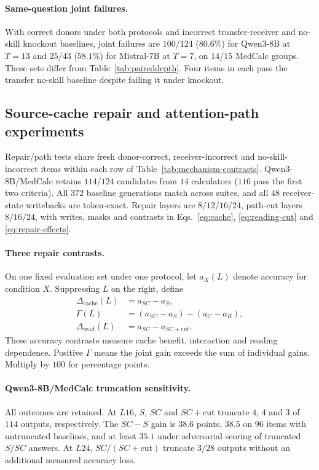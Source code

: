 \paragraph{Same-question joint failures.}
\label{app:joint-failure}
With correct donors under both protocols and incorrect transfer-receiver
and no-skill knockout baselines, joint failures are $100/124$ ($80.6\%$)
for Qwen3-8B at $T=13$ and $25/43$ ($58.1\%$) for Mistral-7B at $T=7$,
on $14/15$ MedCalc groups. These sets differ from Table~\ref{tab:paireddepth}.
Four items in each pass the transfer no-skill baseline despite failing
it under knockout.

\subsection{Source-cache repair and attention-path experiments}
\label{app:mechanism}

Repair/path tests share fresh donor-correct, receiver-incorrect and
no-skill-incorrect items within each row of Table~\ref{tab:mechanism-contrasts}.
Qwen3-8B/MedCalc retains $114/124$ candidates from $14$ calculators
($116$ pass the first two criteria). All $372$ baseline generations match
across suites, and all $48$ receiver-state writebacks are token-exact.
Repair layers are $8/12/16/24$, path-cut layers $8/16/24$, with writes,
masks and contrasts in Eqs.~\eqref{eq:cache}, \eqref{eq:reading-cut}
and \eqref{eq:repair-effects}.

\paragraph{Three repair contrasts.}
On one fixed evaluation set under one protocol, let $a_X(L)$ denote
accuracy for condition $X$. Suppressing $L$ on the right, define
\begin{equation}
\begin{aligned}
\Delta_{\mathrm{cache}}(L)&=a_{SC}-a_S,\\
\Gamma(L)&=(a_{SC}-a_S)-(a_C-a_R),\\
\Delta_{\mathrm{read}}(L)&=a_{SC}-a_{SC+\mathrm{cut}}.
\end{aligned}
\label{eq:repair-effects}
\end{equation}
These accuracy contrasts measure cache benefit, interaction and reading
dependence. Positive $\Gamma$ means the joint gain exceeds the sum of
individual gains. Multiply by $100$ for percentage points.

\paragraph{Qwen3-8B/MedCalc truncation sensitivity.}
All outcomes are retained. At $L16$, $S$, $SC$ and $SC+\mathrm{cut}$
truncate $4$, $4$ and $3$ of $114$ outputs, respectively. The $SC-S$ gain is $38.6$
points, $38.5$ on $96$ items with untruncated baselines, and at least
$35.1$ under adversarial scoring of truncated $S/SC$ answers.
At $L24$, $SC/(SC+\mathrm{cut})$ truncate $3/28$ outputs without an
additional measured accuracy loss.


